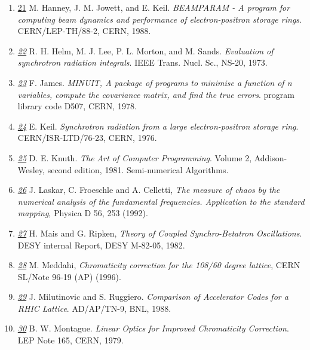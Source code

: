 \begin{enumerate}
   \item \href{beamparam<i}{21} M. Hanney, J. M. Jowett, and
     E. Keil. \textit{BEAMPARAM - A program for computing beam dynamics
       and   performance of electron-positron storage
       rings}. CERN/LEP-TH/88-2, CERN, 1988.  


   \item \href{helm}{\textit{22}} R. H. Helm, M. J. Lee, P. L. Morton,
     and M. Sands. \textit{Evaluation of synchrotron radiation
       integrals}. IEEE Trans. Nucl. Sc., NS-20, 1973.  


   \item \href{minuit}{\textit{23}} F. James. \textit{MINUIT, A package
     of programs to minimise a function of n   variables, compute the
     covariance matrix, and find the true errors}. program library code
     D507, CERN, 1978.  
	\label{bib:minuit}

   \item \href{keil}{\textit{24}} E. Keil. \textit{Synchrotron radiation
     from a large electron-positron storage ring}. CERN/ISR-LTD/76-23,
     CERN, 1976.  


   \item \href{knuth}{\textit{25}} D. E. Knuth. \textit{The Art of
     Computer Programming}. Volume 2, Addison-Wesley, second edition,
     1981. Semi-numerical Algorithms.  


   \item \href{laskar}{\textit{26}} J. Laskar, C. Froeschle and
     A. Celletti, \textit{The measure of chaos by the numerical analysis
       of the fundamental   frequencies. Application to the standard
       mapping}, Physica D 56, 253 (1992).  


   \item \href{mais}{\textit{27}} H. Mais and G. Ripken, \textit{Theory
     of Coupled Synchro-Betatron Oscillations}. DESY internal Report,
     DESY M-82-05, 1982.  

     
   \item \href{malika}{\textit{28}} M. Meddahi, \textit{Chromaticity
     correction for the 108/60 degree lattice}, CERN SL/Note 96-19 (AP)
     (1996).  


   \item \href{ruggiero}{\textit{29}} J. Milutinovic and
     S. Ruggiero. \textit{Comparison of Accelerator Codes for a RHIC
       Lattice}. AD/AP/TN-9, BNL, 1988.  


   \item \href{montague}{\textit{30}} B. W. Montague. \textit{Linear
     Optics for Improved Chromaticity Correction}. LEP Note 165, CERN,
     1979.  



\end{enumerate}
